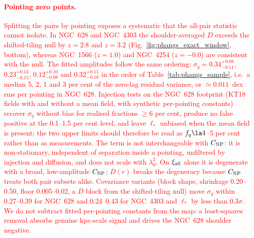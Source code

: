 \documentclass[fleqn,usenatbib]{mnras}
\newcommand{\revadd}[1]{\textcolor{red}{#1}}
\begin{document}
\revadd{\paragraph*{Pointing zero points.}  Splitting the pairs by pointing exposes a systematic that the all-pair statistic cannot isolate.  In NGC~628 and NGC~4303 the shoulder-averaged $D$ exceeds the shifted-tiling null by $z=2.8$ and $z=3.2$ (Fig.~\ref{fig:phangs_exact_window}, bottom), whereas NGC~1566 ($z=1.0$) and NGC~4254 ($z=-0.0$) are consistent with the null.  The fitted amplitudes follow the same ordering: $\sigma_q=0.34^{+0.08}_{-0.11}$, $0.23^{+0.13}_{-0.15}$, $0.12^{+0.10}_{-0.08}$ and $0.32^{+0.15}_{-0.18}$ in the order of Table~\ref{tab:phangs_sample}, i.e.\ a median 5, 2, 1 and 3 per cent of the zero-lag residual variance, or $\simeq0.011$~dex rms per pointing in NGC~628.  Injection tests on the NGC~628 footprint (KT18 fields with and without a mean field, with synthetic per-pointing constants) recover $\sigma_q$ without bias for realised fractions $\geq6$ per cent, produce no false positive at the 0.1--1.5 per cent level, and leave $\ell_\ast$ unbiased when the mean field is present; the two upper limits should therefore be read as $f_q\la4$--5 per cent rather than as measurements.  The term is not interchangeable with $C_{\rm NP}$: it is non-stationary, independent of separation inside a pointing, unfiltered by injection and diffusion, and does not scale with $\lambda_0^2$.  On $\xi_{\rm all}$ alone it is degenerate with a broad, low-amplitude $C_{\rm NP}$; $D(r)$ breaks the degeneracy because $C_{\rm NP}$ treats both pair subsets alike.  Covariance variants (block shape, shrinkage 0.20--0.50, floor 0.005--0.02, a $D$ block from the shifted-tiling null) move $\sigma_q$ within 0.27--0.39 for NGC~628 and 0.24--0.43 for NGC~4303 and $\ell_\ast$ by less than $0.3\sigma$.  We do not subtract fitted per-pointing constants from the map: a least-squares removal absorbs genuine kpc-scale signal and drives the NGC~628 shoulder negative.}
\end{document}
